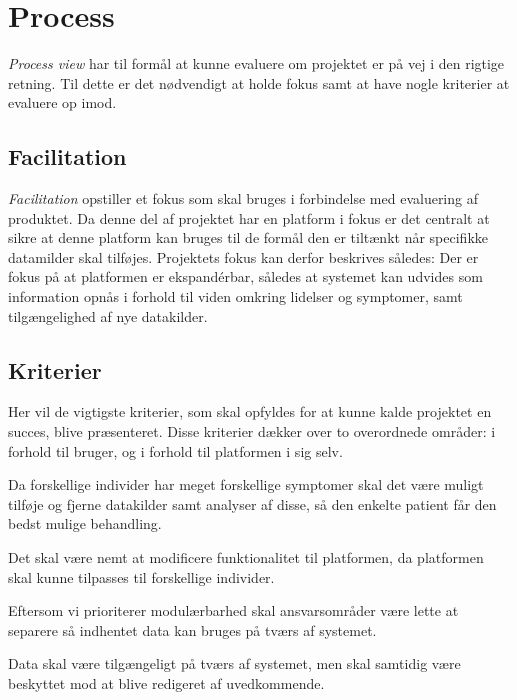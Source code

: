 \section{Process}\label{sec:process}
\emph{Process view} har til formål at kunne evaluere om projektet er på vej i den rigtige retning. 
Til dette er det nødvendigt at holde fokus samt at have nogle kriterier at evaluere op imod.

\subsection{Facilitation}
\emph{Facilitation} opstiller et fokus som skal bruges i forbindelse med evaluering af produktet.
Da denne del af projektet har en platform i fokus er det centralt at sikre at denne platform kan bruges til de formål den er tiltænkt når specifikke datamilder skal tilføjes.
Projektets fokus kan derfor beskrives således:
Der er fokus på at platformen er ekspandérbar, således at systemet kan udvides som information opnås i forhold til viden omkring lidelser og symptomer, samt tilgængelighed af nye datakilder.

\subsection{Kriterier}\label{firstsubseckriterier}
Her vil de vigtigste kriterier, som skal opfyldes for at kunne kalde projektet en succes, blive præsenteret.
Disse kriterier dækker over to overordnede områder: i forhold til bruger, og i forhold til platformen i sig selv.

\begin{description}[style=nextline]
	\item[Modulær] 
	Da forskellige individer har meget forskellige symptomer skal det være muligt tilføje og fjerne datakilder samt analyser af disse, så den enkelte patient får den bedst mulige behandling.
	\item[Fleksibilitet]
	Det skal være nemt at modificere funktionalitet til platformen, da platformen skal kunne tilpasses til forskellige individer.
	\item[Kombinerbar] Eftersom vi prioriterer modulærbarhed skal ansvarsområder være lette at separere så indhentet data kan bruges på tværs af systemet.
	\item[Kommunikation] Data skal være tilgængeligt på tværs af systemet, men skal samtidig være beskyttet mod at blive redigeret af uvedkommende.
\end{description}